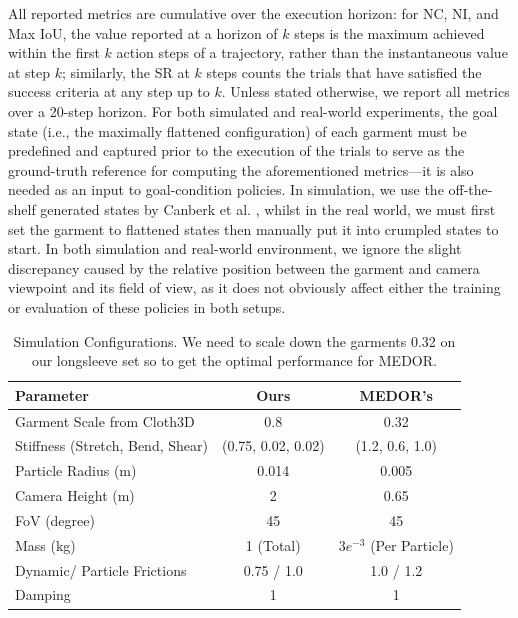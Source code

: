 \documentclass[journal]{IEEEtran}
\begin{document}
All reported metrics are cumulative over the execution horizon: for NC, NI, and Max IoU, the value reported at a horizon of $k$ steps is the maximum achieved within the first $k$ action steps of a trajectory, rather than the instantaneous value at step $k$; similarly, the SR at $k$ steps counts the trials that have satisfied the success criteria at any step up to $k$. Unless stated otherwise, we report all metrics over a 20-step horizon. For both simulated and real-world experiments, the goal state (i.e., the maximally flattened configuration) of each garment must be predefined and captured prior to the execution of the trials to serve as the ground-truth reference for computing the aforementioned metrics---it is also needed as an input to goal-condition policies. In simulation, we use the off-the-shelf generated states by Canberk et al. \cite{canberk2023cloth}, whilst in the real world, we must first set the garment to flattened states then manually put it into crumpled states to start. In both simulation and real-world environment, we ignore the slight discrepancy caused by the relative position between the garment and camera viewpoint and its field of view, as it does not obviously affect either the training or evaluation of these policies in both setups.
\begin{table}[!t]
\centering
\caption{Simulation Configurations. We need to scale down the garments 0.32 on our longsleeve set so to get the optimal performance for MEDOR.}
\label{tab:sim-config}
\begin{tabular}{@{}lcc@{}}
\toprule
\textbf{Parameter} & \textbf{Ours} & \textbf{MEDOR's} \\ \midrule
Garment Scale from Cloth3D & 0.8 & 0.32\\
Stiffness (Stretch, Bend, Shear) & (0.75, 0.02, 0.02) & (1.2, 0.6, 1.0) \\
Particle Radius (m) & 0.014 & 0.005 \\
Camera Height (m) & 2 & 0.65\\
FoV (degree) & 45 & 45\\
Mass (kg) & 1 (Total) & $3e^{-3}$ (Per Particle) \\
Dynamic/ Particle Frictions & 0.75 / 1.0&  1.0 / 1.2\\
Damping & 1 & 1 \\
\bottomrule
\end{tabular}
\end{table}
\end{document}
